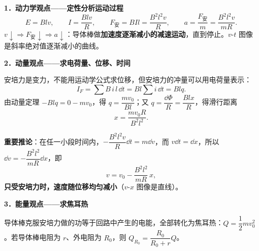 \begin{fangfa}[电磁阻尼问题的三个观点]
\textbf{1．动力学观点——定性分析运动过程}
\[E=Blv,\qquad I=\frac{Blv}{R},\qquad F_{\text{安}}=BIl=\frac{B^2l^2v}{R},\qquad a=\frac{F_{\text{安}}}{m}=\frac{B^2l^2v}{mR}.\]
$v\downarrow\Rightarrow F_{\text{安}}\downarrow\Rightarrow a\downarrow$：导体棒做\textbf{加速度逐渐减小的减速运动}，直到停止。$v$-$t$ 图像是斜率绝对值逐渐减小的曲线。

\textbf{2．动量观点——求电荷量、位移、时间}

安培力是变力，不能用运动学公式求位移，但安培力的冲量可以用电荷量表示：
\[I_{F}=\sum B\,i\,l\,\dd t=Bl\sum i\,\dd t=Blq .\]
由动量定理 $-Blq=0-mv_0$，得 $q=\dfrac{mv_0}{Bl}$；又 $q=\dfrac{\dd\Phi}{R}=\dfrac{Blx}{R}$，得滑行距离
\[x=\frac{mv_0R}{B^2l^2}.\]

\noindent\begin{minipage}[c]{0.6\linewidth}
\textbf{重要推论}：在任一小段时间内，$-\dfrac{B^2l^2v}{R}\dd t=m\dd v$，而 $v\dd t=\dd x$，所以 $\dd v=-\dfrac{B^2l^2}{mR}\dd x$，即
\[v=v_0-\frac{B^2l^2}{mR}\,x ,\]
\textbf{只受安培力时，速度随位移均匀减小}（$v$-$x$ 图像是直线）。
\end{minipage}\hfill
\noindent\begin{minipage}[c]{0.37\linewidth}
\centering
{}
\end{minipage}

\textbf{3．能量观点——求焦耳热}

导体棒克服安培力做的功等于回路中产生的电能，全部转化为焦耳热：$Q=\dfrac12mv_0^2$。若导体棒电阻为 $r$、外电阻为 $R_0$，则 $Q_{R_0}=\dfrac{R_0}{R_0+r}Q$。
\end{fangfa}

